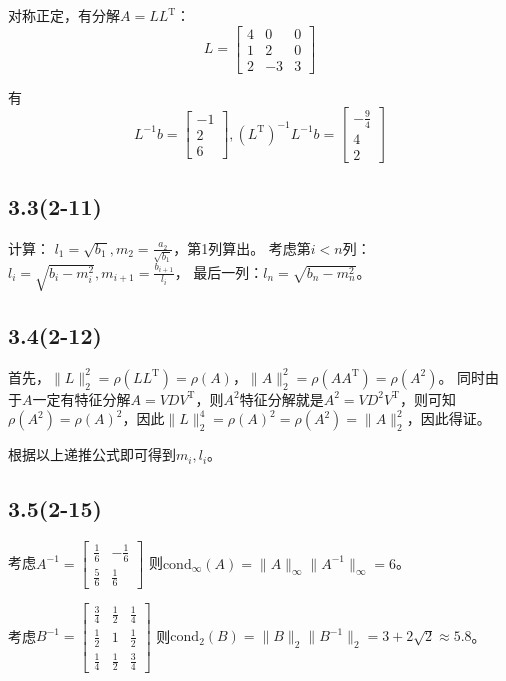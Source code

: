 \documentclass[UTF8,zihao=5]{ctexart}
\newcommand{\trans}[0]{^\mathrm{T}}
\begin{document}
对称正定，有分解$A=LL\trans$：
$$
    L=
    \left[\begin{array}{ccc} 4 & 0 & 0\\ 1 & 2 & 0\\ 2 & -3 & 3 \end{array}\right]
$$

有
$$
    L^{-1}b=
    \left[\begin{array}{c} -1\\ 2\\ 6 \end{array}\right],
    (L\trans)^{-1}L^{-1}b=
    \left[\begin{array}{c} -\frac{9}{4}\\ 4\\ 2 \end{array}\right]
$$

\subsection*{3.3(2-11)}
计算：
$l_1=\sqrt{b_1}, m_2 = \frac{a_2}{\sqrt{b_1}}$，第1列算出。
考虑第$i<n$列：$l_i=\sqrt{b_i-m_i^2}, m_{i+1}=\frac{b_{i+1}}{l_i}$，
最后一列：$l_n=\sqrt{b_n-m_n^2}$。

\subsection*{3.4(2-12)}

首先，$\|L\|_2^2=\rho(LL\trans)=\rho(A)$，$\|A\|_2^2=\rho(AA\trans)=\rho(A^2)$。
同时由于$A$一定有特征分解$A=VDV\trans$，则$A^2$特征分解就是$A^2=VD^2V\trans$，则可知
$\rho(A^2)=\rho(A)^2$，因此$\|L\|_2^4=\rho(A)^2=\rho(A^2)=\|A\|_2^2$，因此得证。

根据以上递推公式即可得到$m_i,l_i$。

\subsection*{3.5(2-15)}

考虑$A^{-1}=\left[\begin{array}{cc} \frac{1}{6} & -\frac{1}{6}\\ \frac{5}{6} & \frac{1}{6} \end{array}\right]$
则$\mathrm{cond}_\infty(A)=\|A\|_\infty\|A^{-1}\|_\infty=6$。

考虑$B^{-1}=\left[\begin{array}{ccc} \frac{3}{4} & \frac{1}{2} & \frac{1}{4}\\ \frac{1}{2} & 1 & \frac{1}{2}\\ \frac{1}{4} & \frac{1}{2} & \frac{3}{4} \end{array}\right]$
则$\mathrm{cond}_2(B)=\|B\|_2\|B^{-1}\|_2=3+2\sqrt{2}\approx5.8$。
\end{document}
